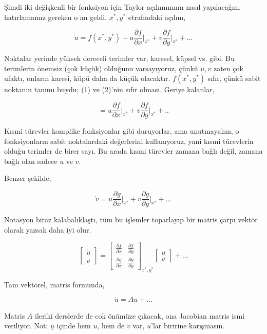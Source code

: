 \documentclass[12pt,fleqn]{article}\usepackage{../../common}
\begin{document}
Şimdi iki değişkenli bir fonksiyon için Taylor açılımınının nasıl yapılacağını
hatırlamamız gereken o an geldi. $x^*,y^*$ etrafındaki açılım,

$$
\dot{u} = f(x^*,y^*) + u \frac{\partial f}{\partial x}\bigg|_{x^*} +
v \frac{\partial f}{\partial y}\bigg|_{x^*} + ...
$$ 

Noktalar yerinde yüksek dereceli terimler var, karesel, küpsel vs. gibi. Bu
terimlerin önemsiz (çok küçük) olduğunu varsayıyoruz, çünkü $u,v$ zaten çok
ufaktı, onların karesi, küpü daha da küçük olacaktır. $f(x^*,y^*)$ sıfır, çünkü
sabit noktanın tanımı buydu; (1) ve (2)'nin sıfır olması. Geriye kalanlar, 

$$
=u \frac{\partial f}{\partial x}\bigg|_{x^*} +
 v \frac{\partial f}{\partial y}\bigg|_{x^*} + ..
$$ 

Kısmi türevler komplike fonksiyonlar gibi duruyorlar, ama unutmayalım, o
fonksiyonların sabit noktalardaki değerlerini kullanıyoruz, yani kısmi
türevlerin olduğu terimler de birer sayı. Bu arada kısmi türevler zamana bağlı
değil, zamana bağlı olan sadece $u$ ve $v$.

Benzer şekilde,

$$
\dot{v} =
u \frac{\partial g}{\partial x}\bigg|_{x^*} +
v \frac{\partial g}{\partial y}\bigg|_{x^*} + ...
$$ 

Notasyon biraz kalabalıklaştı, tüm bu işlemler toparlayıp bir matris çarpı
vektör olarak yazsak daha iyi olur.

$$
\left[\begin{array}{r}
\dot{u} \\ \dot{v}
\end{array}\right]
=
\left[\begin{array}{rr}
\frac{\partial f}{\partial x} & \frac{\partial f}{\partial y} \\
\frac{\partial g}{\partial x} & \frac{\partial g}{\partial y} 
\end{array}\right]_{x^*,y^*}
\left[\begin{array}{r} u \\ v \end{array}\right]
+ ...
$$

Tam vektörel, matris formunda,

$$ \dot{\underline{u}} = A \underline{u} + ...$$


Matris $A$ ileriki derslerde de cok önümüze çıkacak, ona Jacobian matris ismi
veriliyor.  Not: $\underline{u}$ içinde hem $\dot{u}$, hem de $\dot{v}$ var,
$u$'lar biririne karışmasın.
\end{document}

